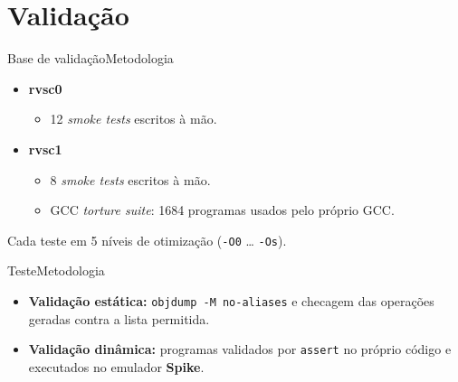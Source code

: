 \documentclass[aspectratio=169]{beamer} %
\begin{document}
\section{Validação}

\begin{frame}{Base de validação}{Metodologia}
    \begin{itemize}
        \item \textbf{rvsc0}
        \begin{itemize}
            \item 12 \textit{smoke tests} escritos à mão.
        \end{itemize}
        \item \textbf{rvsc1}
        \begin{itemize}
            \item 8 \textit{smoke tests} escritos à mão.
            \item GCC \textit{torture suite}: 1684 programas usados pelo
                  próprio GCC.
        \end{itemize}
    \end{itemize}
    \vfill
    \centering Cada teste em 5 níveis de otimização
    (\texttt{-O0} \dots{} \texttt{-Os}).
\end{frame}

\begin{frame}{Teste}{Metodologia}
    \begin{itemize}
        \item \textbf{Validação estática:} \texttt{objdump -M no-aliases} e
              checagem das operações geradas contra a lista permitida.
        \item \textbf{Validação dinâmica:} programas validados por
              \texttt{assert} no próprio código e executados no emulador
              \textbf{Spike}.
    \end{itemize}
    \vfill
\end{frame}



\end{document}
